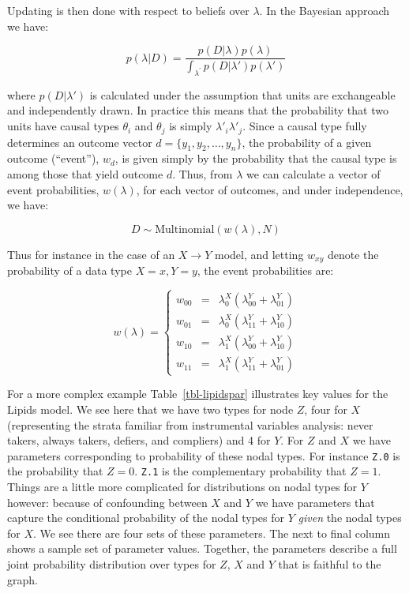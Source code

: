 \documentclass[
  11pt,
  article]{jss}
\begin{document}
Updating is then done with respect to beliefs over \(\lambda\). In the
Bayesian approach we have:

\[
p(\lambda|D) = \frac{p(D|\lambda)p(\lambda)}{\int_{\lambda^{'}} p(D|\lambda')p(\lambda')}
\]

where \(p(D|\lambda')\) is calculated under the assumption that units
are exchangeable and independently drawn. In practice this means that
the probability that two units have causal types \(\theta_i\) and
\(\theta_j\) is simply \(\lambda'_i\lambda'_j\). Since a causal type
fully determines an outcome vector \(d = \{y_1, y_2,\dots,y_n\}\), the
probability of a given outcome (``event''), \(w_d\), is given simply by
the probability that the causal type is among those that yield outcome
\(d\). Thus, from \(\lambda\) we can calculate a vector of event
probabilities, \(w(\lambda)\), for each vector of outcomes, and under
independence, we have:

\[
D \sim \text{Multinomial}(w(\lambda), N)
\]

Thus for instance in the case of an \(X \rightarrow Y\) model, and
letting \(w_{xy}\) denote the probability of a data type \(X=x, Y=y\),
the event probabilities are:

\[
w(\lambda) = \left\{\begin{array}{ccc} w_{00} & = & \lambda^X_0(\lambda^Y_{00} + \lambda^Y_{01})\\ 
w_{01} & = & \lambda^X_0(\lambda^Y_{11} + \lambda^Y_{10})\\
w_{10} & = & \lambda^X_1(\lambda^Y_{00} + \lambda^Y_{10})\\
w_{11} & = & \lambda^X_1(\lambda^Y_{11} + \lambda^Y_{01})\end{array} \right.
\]

For a more complex example Table~\ref{tbl-lipidspar} illustrates key
values for the Lipids model. We see here that we have two types for node
\(Z\), four for \(X\) (representing the strata familiar from
instrumental variables analysis: never takers, always takers, defiers,
and compliers) and 4 for \(Y\). For \(Z\) and \(X\) we have parameters
corresponding to probability of these nodal types. For instance
\texttt{Z.0} is the probability that \(Z=0\). \texttt{Z.1} is the
complementary probability that \(Z=1\). Things are a little more
complicated for distributions on nodal types for \(Y\) however: because
of confounding between \(X\) and \(Y\) we have parameters that capture
the conditional probability of the nodal types for \(Y\) \emph{given}
the nodal types for \(X\). We see there are four sets of these
parameters. The next to final column shows a sample set of parameter
values. Together, the parameters describe a full joint probability
distribution over types for \(Z\), \(X\) and \(Y\) that is faithful to
the graph.
\end{document}
